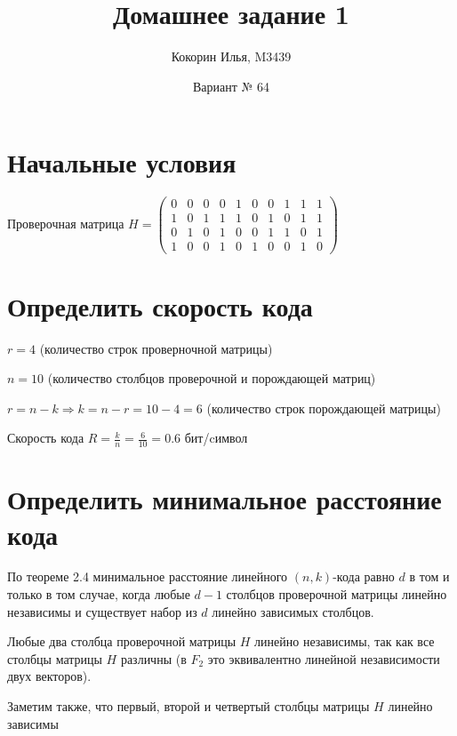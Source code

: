 \documentclass{article}
\title{Домашнее задание 1}
\author{Кокорин Илья, M3439}
\date{Вариант № 64}
\begin{document}
	\maketitle
	\section{Начальные условия}
	Проверочная матрица
	$
	H = \left(
	\begin{array}{cccccccccc}
	0 & 0 & 0 & 0 & 1 & 0 & 0 & 1 & 1 & 1\\
	1 & 0 & 1 & 1 & 1 & 0 & 1 & 0 & 1 & 1\\
	0 & 1 & 0 & 1 & 0 & 0 & 1 & 1 & 0 & 1\\
	1 & 0 & 0 & 1 & 0 & 1 & 0 & 0 & 1 & 0
	\end{array}
	\right)
	$
	
	\section{Определить скорость кода}
	
	$r = 4$ (количество строк проверночной матрицы)
	
	$n = 10$ (количество столбцов проверочной и порождающей матриц)
	
	$r = n - k \Rightarrow k = n - r = 10 - 4 = 6$ (количество строк порождающей матрицы)
	
	Скорость кода $R = \frac{k}{n} = \frac{6}{10} = 0.6$ бит/cимвол
	
	\section{Определить минимальное расстояние кода}
	
	По теореме 2.4 минимальное расстояние линейного $(n, k)$-кода равно $d$ в том и только в том случае, когда любые $d - 1$ столбцов проверочной матрицы линейно независимы и существует набор из $d$ линейно зависимых столбцов.
	
	Любые два столбца проверочной матрицы $H$ линейно независимы, так как все столбцы матрицы $H$ различны (в $F_2$ это эквивалентно линейной независимости двух векторов).
	
	Заметим также, что первый, второй и четвертый столбцы матрицы $H$ линейно зависимы
	
\end{document}
